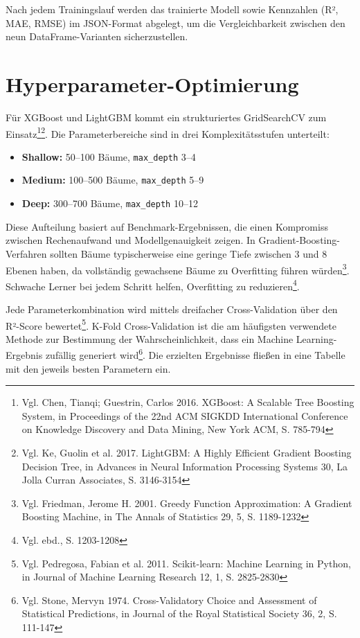 Nach jedem Trainingslauf werden das trainierte Modell sowie Kennzahlen (R², MAE, RMSE) im JSON-Format abgelegt, um die Vergleichbarkeit zwischen den neun DataFrame-Varianten sicherzustellen.

\section{Hyperparameter-Optimierung}

Für XGBoost und LightGBM kommt ein strukturiertes GridSearchCV zum Einsatz\footnote{Vgl. Chen, Tianqi; Guestrin, Carlos 2016. XGBoost: A Scalable Tree Boosting System, in Proceedings of the 22nd ACM SIGKDD International Conference on Knowledge Discovery and Data Mining, New York ACM, S. 785-794}\footnote{Vgl. Ke, Guolin et al. 2017. LightGBM: A Highly Efficient Gradient Boosting Decision Tree, in Advances in Neural Information Processing Systems 30, La Jolla Curran Associates, S. 3146-3154}. Die Parameterbereiche sind in drei Komplexitätsstufen unterteilt:

\begin{itemize}
  \item \textbf{Shallow:} 50–100 Bäume, \texttt{max\_depth} 3–4
  \item \textbf{Medium:} 100–500 Bäume, \texttt{max\_depth} 5–9
  \item \textbf{Deep:} 300–700 Bäume, \texttt{max\_depth} 10–12
\end{itemize}

Diese Aufteilung basiert auf Benchmark-Ergebnissen, die einen Kompromiss zwischen Rechenaufwand und Modellgenauigkeit zeigen. In Gradient-Boosting-Verfahren sollten Bäume typischerweise eine geringe Tiefe zwischen 3 und 8 Ebenen haben, da vollständig gewachsene Bäume zu Overfitting führen würden\footnote{Vgl. Friedman, Jerome H. 2001. Greedy Function Approximation: A Gradient Boosting Machine, in The Annals of Statistics 29, 5, S. 1189-1232}. Schwache Lerner bei jedem Schritt helfen, Overfitting zu reduzieren\footnote{Vgl. ebd., S. 1203-1208}.

Jede Parameterkombination wird mittels dreifacher Cross-Validation über den R²-Score bewertet\footnote{Vgl. Pedregosa, Fabian et al. 2011. Scikit-learn: Machine Learning in Python, in Journal of Machine Learning Research 12, 1, S. 2825-2830}. K-Fold Cross-Validation ist die am häufigsten verwendete Methode zur Bestimmung der Wahrscheinlichkeit, dass ein Machine Learning-Ergebnis zufällig generiert wird\footnote{Vgl. Stone, Mervyn 1974. Cross-Validatory Choice and Assessment of Statistical Predictions, in Journal of the Royal Statistical Society 36, 2, S. 111-147}. Die erzielten Ergebnisse fließen in eine Tabelle mit den jeweils besten Parametern ein.

